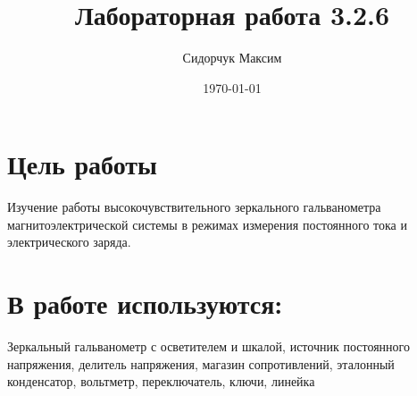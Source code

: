 \documentclass[a4paper]{article}
\date{\today}
\title{Лабораторная работа 3.2.6}
\author{Сидорчук Максим}
\begin{document}
\maketitle

\section{Цель работы}
Изучение работы высокочувствительного зеркального гальванометра магнитоэлектрической системы в режимах измерения постоянного тока и электрического заряда.

\section{В работе используются:}
Зеркальный гальванометр с осветителем и шкалой, источник постоянного напряжения, делитель напряжения, магазин сопротивлений, эталонный конденсатор, вольтметр, переключатель, ключи, линейка



\end{document}
